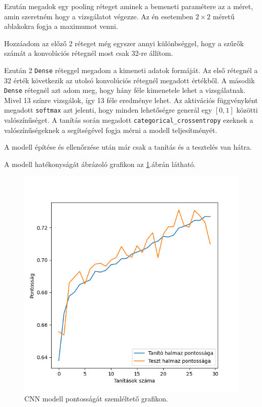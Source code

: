 Ezután megadok egy pooling réteget aminek a bemeneti paramétere az a méret, amin szeretném hogy a vizsgálatot végezze. Az én esetemben $2 \times 2$ méretű ablakokra fogja a maximumot venni.

Hozzáadom az előző 2 réteget még egyszer annyi különbséggel, hogy a szűrők számát a konvolúciós rétegnél most csak 32-re állítom.

Ezután 2 \texttt{Dense} réteggel megadom a kimeneti adatok formáját. Az első rétegnél a 32 érték következik az utolsó konvolúciós rétegnél megadott értékből. A második \texttt{Dense} rétegnél azt adom meg, hogy hány féle kimenetele lehet a vizsgálatnak. Mivel 13 színre vizsgálok, így 13 féle eredménye lehet. Az aktivációs függvényként megadott \texttt{softmax} azt jelenti, hogy minden lehetőségre generál egy $[0, 1]$ közötti valószínűséget. A tanítás során megadott \texttt{categorical\_crossentropy} ezeknek a valószínűségeknek a segítségével fogja mérni a modell teljesítményét.

A modell építése és ellenőrzése után már csak a tanítás és a tesztelés van hátra.


A modell hatékonyságát ábrázoló grafikon az \ref{fig:cnn_accuracy}.ábrán látható.

\begin{figure}[h]
\centering
\includegraphics[scale=0.7]{images/cnn_accuracy.png}
\caption{CNN modell pontosságát szemléltető grafikon.}
\label{fig:cnn_accuracy}
\end{figure}

